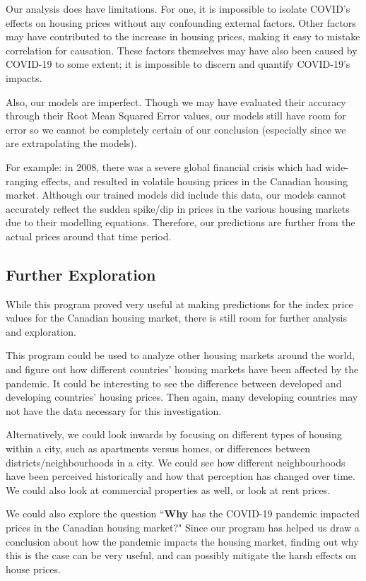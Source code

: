 \documentclass{article}
\begin{document}
Our analysis does have limitations. For one, it is impossible to isolate COVID's effects on housing prices without any confounding external factors. Other factors may have contributed to the increase in housing prices, making it easy to mistake correlation for causation. These factors themselves may have also been caused by COVID-19 to some extent; it is impossible to discern and quantify COVID-19's impacts.

Also, our models are imperfect. Though we may have evaluated their accuracy through their Root Mean Squared Error values, our models still have room for error so we cannot be completely certain of our conclusion (especially since we are extrapolating the models).

For example: in 2008, there was a severe global financial crisis which had wide-ranging effects, and resulted in volatile housing prices in the Canadian housing market. Although our trained models did include this data, our models cannot accurately reflect the sudden spike/dip in prices in the various housing markets due to their modelling equations. Therefore, our predictions are further from the actual prices around that time period.

\subsection{Further Exploration}

While this program proved very useful at making predictions for the index price values for the Canadian housing market, there is still room for further analysis and exploration.

This program could be used to analyze other housing markets around the world, and figure out how different countries' housing markets have been affected by the pandemic. It could be interesting to see the difference between developed and developing countries' housing prices. Then again, many developing countries may not have the data necessary for this investigation.

Alternatively, we could look inwards by focusing on different types of housing within a city, such as apartments versus homes, or differences between districts/neighbourhoods in a city. We could see how different neighbourhoods have been perceived historically and how that perception has changed over time. We could also look at commercial properties as well, or look at rent prices.

We could also explore the question ``\textbf{Why} has the COVID-19 pandemic impacted prices in the Canadian housing market?" Since our program has helped us draw a conclusion about how the pandemic impacts the housing market, finding out why this is the case can be very useful, and can possibly mitigate the harsh effects on house prices.
\end{document}

